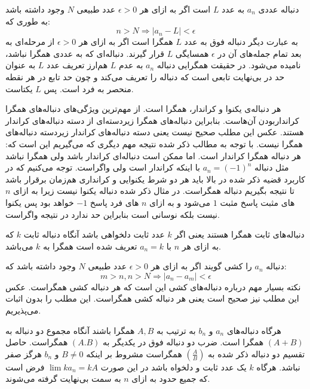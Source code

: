\begin{definition}
	\p
دنباله عددی
$a_n$
 به عدد 
$L$
است اگر به ازای هر
$\epsilon > 0$
عدد طبیعی
$N$
وجود داشته باشد به طوری که:
$$n > N \Rightarrow |a_n - L| < \epsilon$$
به عبارت دیگر دنباله فوق به عدد
$L$
همگرا است اگر به ازای هر
$\epsilon > 0$
از مرحله‌ای به بعد تمام جمله‌های آن در
$\epsilon$
 همسایگی
$L$
 قرار گیرند. دنباله‌ای که به عددی همگرا نباشد، 
  نامیده می‌شود. در حقیقت همگرایی دنباله 
$a_n$
به عدم 
$L$
هم‌ارز تعریف عدد
$L$
به عنوان حد در بی‌نهایت تابعی است که دنباله را تعریف می‌کند و چون حد تابع در هر نقطه منحصر به فرد است. پس
$L$
یکتاست.
\end{definition}
	
\begin{theorem}
	\p
هر دنباله‌ی یکنوا و کراندار، همگرا است. از مهم‌ترین ویژگی‌های دنباله‌های همگرا کرانداربودن آن‌هاست. بنابراین دنباله‌های همگرا زیردسته‌ای از دسته دنباله‌های کراندار هستند. عکس این مطلب صحیح نیست یعنی دسته دنباله‌های کراندار زیردسته دنباله‌های همگرا نیست. با توجه به مطالب ذکر شده نتیجه مهم دیگری که می‌گیریم این است که: هر دنباله همگرا کراندار است. اما ممکن است دنباله‌ای کراندار باشد ولی همگرا نباشد مثل دنباله
$a_n = (-1)^n$
با اینکه کراندار است ولی واگراست. توجه می‌کنیم که در کاربرد قضیه ذکر شده در بالا باید هر دو شرط یکنوایی و کرانداری هم‌زمان برقرار باشد تا نتیجه بگیریم دنباله همگراست. در مثال ذکر شده دنباله یکنوا نیست زیرا به ازای
$n$
های مثبت پاسخ مثبت
$1$
می‌شود و به ازای 
$n$
های فرد پاسخ 
$-1$
خواهد بود پس یکنوا نیست بلکه نوسانی است بنابراین حد ندارد در نتیجه واگراست.
\end{theorem}
	\p
	
\begin{NOTE}
دنباله‌های ثابت همگرا هستند یعنی اگر
$k$
عدد ثابت دلخواهی باشد آنگاه دنباله ثابت 
$k$
 که به ازای هر 
$n$
 با 
$a_n = k$
  تعریف شده است همگرا به 
$k$
می‌باشد.
\end{NOTE}

\begin{definition}
	\p
دنباله 
$a_n$
را کشی گویند اگر به ازای هر
$\epsilon > 0$
عدد طبیعی
$N$
وجود داشته باشد که:
$$m > n, n > N \Rightarrow |a_n - a_m| < \epsilon$$
	\p
نکته بسیار مهم درباره دنباله‌های کشی این است که هر دنباله کشی همگراست. عکس این مطلب نیز صحیح است یعنی هر دنباله کشی همگراست. این مطلب را بدون اثبات می‌پذیریم.
\end{definition}

\begin{NOTE}
	\p
هرگاه دنباله‌های
$a_n$
و
$b_n$
 به ترتیب به
$A, B$
همگرا باشند آنگاه مجموع دو دنباله به
$(A + B)$
 همگرا است. ضرب دو دنباله فوق در یکدیگر به 
$(A.B)$
همگراست. حاصل تقسیم دو دنباله ذکر شده به 
$(\frac{A}{B})$
 همگراست مشروط بر اینکه 
$B \neq 0$
 و
$b_n$
هرگز صفر نباشد. هرگاه
$k$
 یک عدد ثابت و دلخواه باشد در این صورت
$\lim ka_n = kA$
فرض است که جمیع حدود به ازای
$n$
به سمت بی‌نهایت گرفته می‌شوند.
\end{NOTE}

